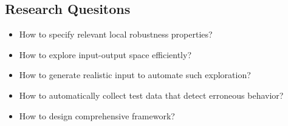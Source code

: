 \documentclass{article}
\begin{document}
\subsection{Research Quesitons}
\begin{itemize}
 \item How to specify relevant local robustness properties?
 \item How to explore input-output space efficiently?
 \item How to generate realistic input to automate such exploration?
 \item How to automatically collect test data that detect erroneous behavior?
 \item How to design comprehensive framework?
\end{itemize}
  
\end{document}
